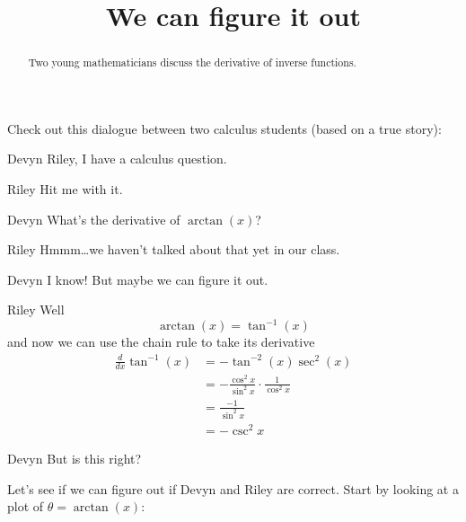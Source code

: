 \documentclass{ximera}
\title[Break-Ground:]{We can figure it out}
\begin{document}
\begin{abstract}
Two young mathematicians discuss the derivative of inverse functions.
\end{abstract}
\maketitle

Check out this dialogue between two calculus students (based on a true
story):

\begin{dialogue}
\item[Devyn] Riley, I have a calculus question.
\item[Riley] Hit me with it.
\item[Devyn] What's the derivative of $\arctan(x)$?
\item[Riley] Hmmm\dots we haven't talked about that yet in our class.
\item[Devyn] I know! But maybe we can figure it out.
\item[Riley] Well
  \[
  \arctan(x) = \tan^{-1}(x)
  \]
  and now we can use the chain rule to take its derivative
  \begin{align*}
    \frac{d}{dx} \tan^{-1}(x) &= -\tan^{-2}(x)\sec^2(x)\\
    &= -\frac{\cos^2x}{\sin^2x}\cdot \frac{1}{\cos^2x}\\
    &= \frac{-1}{\sin^2x}\\
    &= -\csc^2x
  \end{align*}
\item[Devyn] But is this right?
\end{dialogue}

Let's see if we can figure out if Devyn and Riley are correct. Start by looking at a plot of $\theta = \arctan(x)$:

\begin{image}
\end{image}
\end{document}

